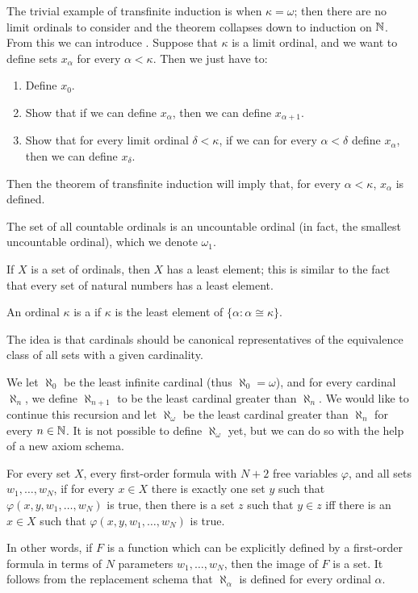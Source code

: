 The trivial example of transfinite induction is when $\kappa = \omega$; then there are no limit ordinals to consider and the theorem collapses down to induction on $\mathbb{N}$.
From this we can introduce .
Suppose that $\kappa$ is a limit ordinal, and we want to define sets $x_\alpha$ for every $\alpha < \kappa$. Then we just have to:
\begin{enumerate}
\item Define $x_0$.
\item Show that if we can define $x_\alpha$, then we can define $x_{\alpha + 1}$.
\item Show that for every limit ordinal $\delta < \kappa$, if we can for every $\alpha < \delta$ define $x_\alpha$, then we can define $x_\delta$.
\end{enumerate}
Then the theorem of transfinite induction will imply that, for every $\alpha < \kappa$, $x_\alpha$ is defined.

The set of all countable ordinals is an uncountable ordinal (in fact, the smallest uncountable ordinal), which we denote $\omega_1$.

If $X$ is a set of ordinals, then $X$ has a least element; this is similar to the fact that every set of natural numbers has a least element.
\begin{definition}
An ordinal $\kappa$ is a  if $\kappa$ is the least element of $\{\alpha: \alpha \cong \kappa\}$.
\end{definition}
The idea is that cardinals should be canonical representatives of the equivalence class of all sets with a given cardinality.

We let $\aleph_0$ be the least infinite cardinal (thus $\aleph_0 = \omega$), and for every cardinal $\aleph_n$, we define $\aleph_{n+1}$ to be the least cardinal greater than $\aleph_n$.
We would like to continue this recursion and let $\aleph_\omega$ be the least cardinal greater than $\aleph_n$ for every $n \in \mathbb{N}$.
It is not possible to define $\aleph_\omega$ yet, but we can do so with the help of a new axiom schema.

\begin{axiom}
For every set $X$, every first-order formula with $N+2$ free variables $\varphi$, and all sets $w_1, \dots, w_N$, if for every $x \in X$ there is exactly one set $y$ such that $\varphi(x, y, w_1, \dots, w_N)$ is true, then there is a set $z$ such that $y \in z$ iff there is an $x \in X$ such that $\varphi(x, y, w_1, \dots, w_N)$ is true.
\end{axiom}
In other words, if $F$ is a function which can be explicitly defined by a first-order formula in terms of $N$ parameters $w_1, \dots, w_N$, then the image of $F$ is a set.
It follows from the replacement schema that $\aleph_\alpha$ is defined for every ordinal $\alpha$.


